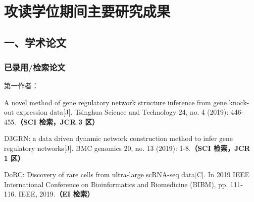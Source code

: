 {~}
\vspace{-9pt}
\section{攻读学位期间主要研究成果} %

\ifblindreview
\fi
\vspace{11pt}
\subsection*{一、学术论文}

\ifblindreview

\subsubsection*{已录用/检索论文}
第一作者：
\begin{enumerate}[label={[\arabic*]},itemindent=2em,wide]

\item A novel method of gene regulatory network structure inference from gene knock-out expression data[J]. Tsinghua Science and Technology 24, no. 4 (2019): 446-455.{\bfseries \heiti（SCI 检索，JCR 3 区）} 
\item D3GRN: a data driven dynamic network construction method to infer gene regulatory networks[J]. BMC genomics 20, no. 13 (2019): 1-8.{\bfseries \heiti（SCI 检索，JCR 1 区）} 
\item DoRC: Discovery of rare cells from ultra-large scRNA-seq data[C]. In 2019 IEEE International Conference on Bioinformatics and Biomedicine (BIBM), pp. 111-116. IEEE, 2019.{\bfseries \heiti（EI 检索）}

\end{enumerate}
